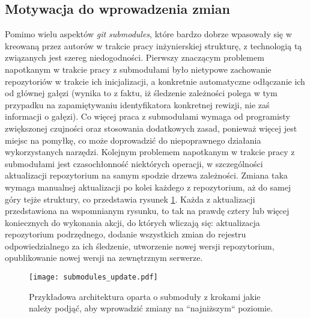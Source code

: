 

\subsection{Motywacja do wprowadzenia zmian}
Pomimo wielu aspektów \emph{git submodules}, które bardzo dobrze wpasowały się w kreowaną przez autorów w trakcie pracy inżynierskiej strukturę, z technologią tą związanych jest szereg niedogodności. Pierwszy znaczącym problemem napotkanym w trakcie pracy z submodułami było nietypowe zachowanie repozytoriów w trakcie ich inicjalizacji, a konkretnie automatyczne odłączanie ich od głównej gałęzi (wynika to z faktu, iż śledzenie zależności polega w tym przypadku na zapamiętywaniu identyfikatora konkretnej rewizji, nie zaś informacji o gałęzi). Co więcej praca z submodułami wymaga od programisty zwiększonej czujności oraz stosowania dodatkowych zasad, ponieważ więcej jest miejsc na pomyłkę, co może doprowadzić do niepoprawnego działania wykorzystanych narzędzi. Kolejnym problemem napotkanym w trakcie pracy z submodułami jest czasochłonność niektórych operacji, w szczególności aktualizacji repozytorium na samym spodzie drzewa zależności. Zmiana taka wymaga manualnej aktualizacji po kolei każdego z repozytorium, aż do samej góry tejże struktury, co przedstawia rysunek \ref {fig:submodules_update}. Każda z aktualizacji przedstawiona na wspomnianym rysunku, to tak na prawdę cztery lub więcej koniecznych do wykonania akcji, do których wliczają się: aktualizacja repozytorium podrzędnego, dodanie wszystkich zmian do rejestru odpowiedzialnego za ich śledzenie, utworzenie nowej wersji repozytorium, opublikowanie nowej wersji na zewnętrznym serwerze.

\begin{figure}[H]
    \centering
    \texttt{[image: submodules\_update.pdf]}
    \caption{Przykładowa architektura oparta o submoduły z krokami jakie należy podjąć, aby wprowadzić zmiany na ``najniższym`` poziomie.}
    \label{fig:submodules_update}
\end{figure}


